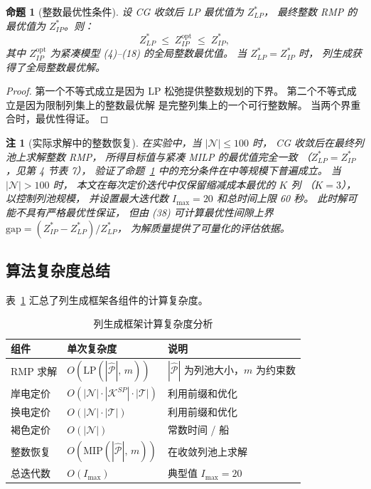 \documentclass[11pt,a4paper]{article}
\newtheorem{proposition}{命题}
\newtheorem{remark}{注}
\begin{document}
\begin{proposition}[整数最优性条件]
\label{prop:integer}
设 CG 收敛后 LP 最优值为 $Z_{LP}^*$，
最终整数 RMP 的最优值为 $Z_{IP}^*$。则：
\begin{equation}
  Z_{LP}^* \;\leq\; Z_{IP}^{\text{opt}} \;\leq\; Z_{IP}^*,
  \tag{38}
\end{equation}
其中 $Z_{IP}^{\text{opt}}$ 为紧凑模型 (4)--(18) 的全局整数最优值。
当 $Z_{LP}^* = Z_{IP}^*$ 时，
列生成获得了全局整数最优解。
\end{proposition}

\begin{proof}
第一个不等式成立是因为 LP 松弛提供整数规划的下界。
第二个不等式成立是因为限制列集上的整数最优解
是完整列集上的一个可行整数解。
当两个界重合时，最优性得证。
\end{proof}

\begin{remark}[实际求解中的整数恢复]
在实验中，当 $|\mathcal{N}| \leq 100$ 时，
CG 收敛后在最终列池上求解整数 RMP，
所得目标值与紧凑 MILP 的最优值完全一致
（$Z_{LP}^* = Z_{IP}^*$，见第 4 节表 7），
验证了命题~\ref{prop:integer} 中的充分条件在中等规模下普遍成立。
当 $|\mathcal{N}| > 100$ 时，
本文在每次定价迭代中仅保留缩减成本最优的 $K$ 列
（$K = 3$），以控制列池规模，
并设置最大迭代数 $I_{\max} = 20$ 和总时间上限 60 秒。
此时解可能不具有严格最优性保证，
但由 (38) 可计算最优性间隙上界
$\text{gap} = (Z_{IP}^* - Z_{LP}^*) / Z_{LP}^*$，
为解质量提供了可量化的评估依据。
\end{remark}

\subsection{算法复杂度总结}

表~\ref{tab:complexity} 汇总了列生成框架各组件的计算复杂度。

\begin{table}[htbp]
\centering
\caption{列生成框架计算复杂度分析}
\label{tab:complexity}
\begin{tabular}{lll}
\toprule
组件 & 单次复杂度 & 说明 \\
\midrule
RMP 求解 & $O(\text{LP}(|\hat{\mathcal{P}}|,\, m))$
  & $|\hat{\mathcal{P}}|$ 为列池大小，$m$ 为约束数 \\
岸电定价 & $O(|\mathcal{N}| \cdot |\mathcal{K}^{SP}| \cdot |\mathcal{T}|)$
  & 利用前缀和优化 \\
换电定价 & $O(|\mathcal{N}| \cdot |\mathcal{T}|)$
  & 利用前缀和优化 \\
褐色定价 & $O(|\mathcal{N}|)$
  & 常数时间 / 船 \\
整数恢复 & $O(\text{MIP}(|\hat{\mathcal{P}}|,\, m))$
  & 在收敛列池上求解 \\
\midrule
总迭代数 & $O(I_{\max})$
  & 典型值 $I_{\max} = 20$ \\
\bottomrule
\end{tabular}
\end{table}
\end{document}
